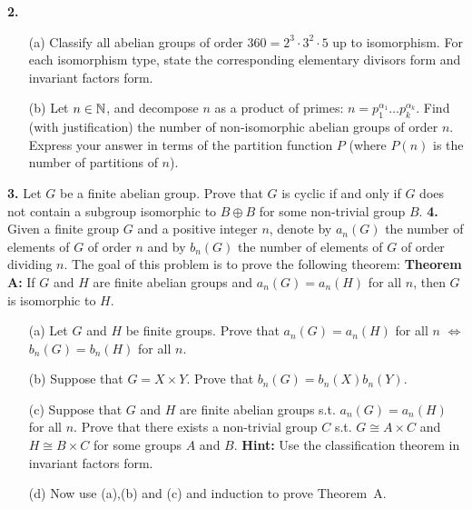 \documentclass[12pt]{amsart}
\begin{document}
{\bf 2.} 
\begin{itemize}
\item[(a)] Classify all abelian groups of order $360=2^3\cdot 3^2\cdot 5$ up to isomorphism. For each isomorphism type, state the corresponding elementary divisors form and invariant factors form.
\item[(b)] Let $n\in{\mathbb N}$, and decompose $n$ as a product of primes: $n=p_1^{\alpha_1}\ldots p_k^{\alpha_k}$. Find (with justification) the number of non-isomorphic abelian groups of order $n$. Express your answer in terms of the partition function $P$ (where $P(n)$ is the number of partitions of $n$).
\end{itemize}
{\bf 3.} Let $G$ be a finite abelian group. Prove that $G$ is cyclic if and only if $G$ does not contain a subgroup isomorphic to $B\oplus B$ for some non-trivial group $B$.
\skv
\skv
{\bf 4.} Given a finite group $G$ and a positive integer $n$, denote
by $a_n (G)$ the number of elements of $G$ of order $n$ and by $b_n(G)$
the  number of elements of $G$ of order dividing $n$. The goal
of this problem is to prove the following theorem:
\skv
{\bf Theorem A:} If $G$ and $H$ are finite abelian groups and $a_n(G)=a_n(H)$ for all $n$, then $G$ is isomorphic to $H$.
\skv
\begin{itemize}
\item[(a)] Let $G$ and $H$ be finite groups. Prove that $a_n(G)=a_n(H)$ for all $n$ $\iff$ $b_n(G)=b_n(H)$ for all $n$.
\item[(b)] Suppose that $G=X\times Y$. Prove that $b_n(G)=b_n(X)b_n(Y)$.
\item[(c)] Suppose that $G$ and $H$ are finite abelian groups s.t. $a_n(G)=a_n(H)$ for all $n$. Prove that there exists a non-trivial
group $C$ s.t. $G\cong A\times C$ and $H\cong B\times C$ for some
groups $A$ and $B$. {\bf Hint:} Use the classification theorem in
invariant factors form.
\item[(d)] Now use (a),(b) and (c) and induction to prove Theorem~A.
\end{itemize}
\end{document}
